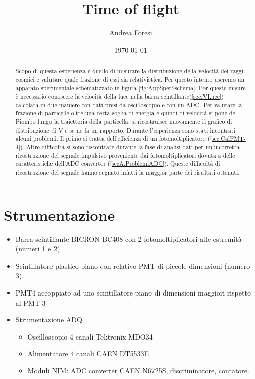 \documentclass[a4paper]{article}
\title{Time of flight}
\author{Andrea Foresi}
\date{\today}
\begin{document}
\maketitle
\tableofcontents



\begin{abstract}
Scopo di questa esperienza è quello di misurare la distribuzione della velocità dei raggi cosmici e valutare quale frazione di essi sia relativistica. Per questo intento useremo un apparato sperimentale schematizzato in figura \ref{fig:AppSperSschema}. Per queste misure è necessario conoscere la velocità della luce nella barra scintillante(\ref{sec:VLuce}) calcolata in due maniere con dati presi da oscilloscopio e con un ADC. Per valutare la frazione di particelle oltre una certa soglia di energia e quindi di velocità si pone del Piombo lungo la traiettoria della particella; si ricostruisce nuovamente il grafico di distribuzione di V e se ne fa un rapporto. Durante l'esperienza sono stati incontrati alcuni problemi. Il primo si tratta dell'efficienza di un fotomoltiplicatore (\ref{sec:CalPMT-4}). Altre difficoltà si sono riscontrate durante la fase di analisi dati per un'incorretta ricostruzione del segnale impulsivo proveniente dai fotomoltiplicatori dovuta a delle caratteristiche dell'ADC converter (\ref{secA:ProblemiADC}). Queste difficoltà di ricostruzione del segnale hanno segnato infatti la maggior parte dei risultati ottenuti.
\end{abstract}


\section{Strumentazione}
\label{sec:AppSper}
\begin{itemize}
\item Barra scintillante BICRON BC408 con 2 fotomoltiplicatori alle estremità (numeri 1 e 2)
\item Scintillatore plastico piano con relativo PMT di piccole dimensioni (numero 3). 
\item PMT4 accoppiato ad uno scintillatore piano di dimensioni maggiori rispetto al PMT-3
\item Strumentazione ADQ
\begin{itemize}
    \item Oscilloscopio 4 canali Tektronix MDO34
    \item Alimentatore 4 canali CAEN DT5533E
    \item Moduli NIM: ADC converter CAEN N6725S, discriminatore, contatore.
\end{itemize}
\end{itemize}
\end{document}
